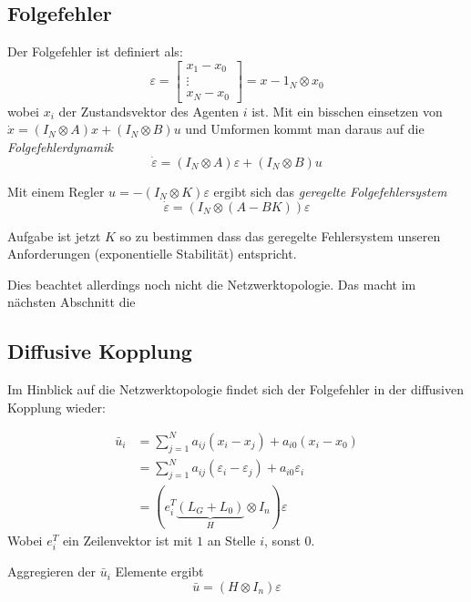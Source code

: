 \subsection{Folgefehler}
Der Folgefehler ist definiert als:
\begin{equation}
    \varepsilon = \begin{bmatrix}
        x_1-x_0 \\
        \vdots \\
        x_N-x_0
    \end{bmatrix}
    = x-1_N \otimes x_0
\end{equation}
wobei $x_i$ der Zustandsvektor des Agenten $i$ ist.
Mit ein bisschen einsetzen von $\dot{x} = (I_N \otimes A)x + (I_N \otimes B)u$
und Umformen kommt man daraus auf die \emph{Folgefehlerdynamik}
\begin{equation}
    \dot{\varepsilon} = (I_N \otimes A)\varepsilon + (I_N \otimes B)u
\end{equation}

Mit einem Regler $u=-(I_N \otimes K)\varepsilon$  ergibt sich das
\emph{geregelte Folgefehlersystem}
\begin{equation}
    \dot{\varepsilon} = (I_N \otimes (A-BK))\varepsilon
\end{equation}

Aufgabe ist jetzt $K$ so zu bestimmen dass das geregelte Fehlersystem unseren
Anforderungen (exponentielle Stabilität) entspricht.

Dies beachtet allerdings noch nicht die Netzwerktopologie.
Das macht im nächsten Abschnitt die

\subsection{Diffusive Kopplung}
Im Hinblick auf die Netzwerktopologie findet sich der Folgefehler in der
diffusiven Kopplung wieder:

\begin{align}
    \bar{u}_i &= \sum_{j=1}^N a_{ij} (x_i-x_j) + a_{i0}(x_i-x_0) \\
    &= \sum_{j=1}^N a_{ij} (\varepsilon_i - \varepsilon_j) + a_{i0} \varepsilon_i \\
    &= \left(e_i^T\underbrace{(L_G+L_0)}_H \otimes I_n\right)\varepsilon
\end{align}
Wobei $e_i^T$ ein Zeilenvektor ist mit $1$ an Stelle $i$, sonst $0$.

Aggregieren der $\bar{u}_i$ Elemente ergibt
\begin{equation}
    \bar{u} = (H \otimes I_n)\varepsilon
\end{equation}


